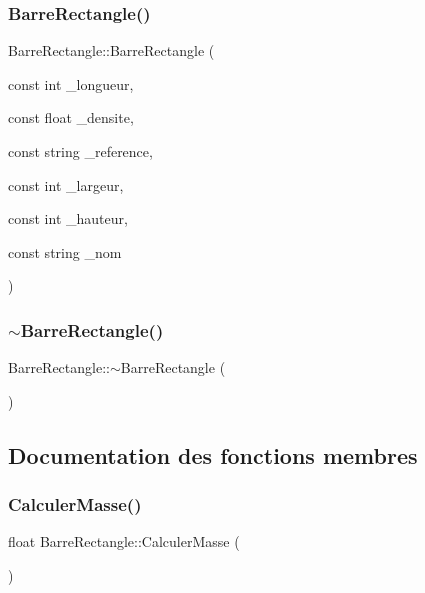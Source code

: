 \subsubsection{\texorpdfstring{Barre\+Rectangle()}{BarreRectangle()}}
{\footnotesize\ttfamily Barre\+Rectangle\+::\+Barre\+Rectangle (\begin{DoxyParamCaption}\item[{const int}]{\+\_\+longueur,  }\item[{const float}]{\+\_\+densite,  }\item[{const string}]{\+\_\+reference,  }\item[{const int}]{\+\_\+largeur,  }\item[{const int}]{\+\_\+hauteur,  }\item[{const string}]{\+\_\+nom }\end{DoxyParamCaption})}

\mbox{\label{class_barre_rectangle_aaf9fee36e7a6b914af9fc0bff25674e4}} 
\subsubsection{\texorpdfstring{$\sim$\+Barre\+Rectangle()}{~BarreRectangle()}}
{\footnotesize\ttfamily Barre\+Rectangle\+::$\sim$\+Barre\+Rectangle (\begin{DoxyParamCaption}{ }\end{DoxyParamCaption})}



\subsection{Documentation des fonctions membres}
\mbox{\label{class_barre_rectangle_a9edb62e31a33790146eb0fd2b3fd7e4e}} 
\subsubsection{\texorpdfstring{Calculer\+Masse()}{CalculerMasse()}}
{\footnotesize\ttfamily float Barre\+Rectangle\+::\+Calculer\+Masse (\begin{DoxyParamCaption}{ }\end{DoxyParamCaption})}

